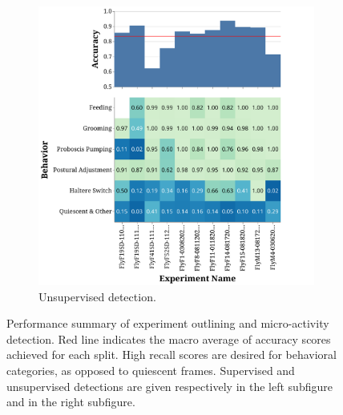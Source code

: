 \begin{figure}[ht!]
\begin{subfigure}[ht!]{0.495\linewidth}
		\centering\includegraphics[width=\linewidth]{figures/OutliningPerformance-Unsupervised.pdf}
		\caption{Unsupervised detection.}
	\end{subfigure}%
	\caption[Performance summary of experiment outlining and micro-activity detection.]{Performance summary of experiment outlining and micro-activity detection.
		Red line indicates the macro average of accuracy scores achieved for each split.
		High recall scores are desired for behavioral categories, as opposed to quiescent frames.
		Supervised and unsupervised detections are given respectively in the left subfigure and in the right subfigure.}
\end{figure}

